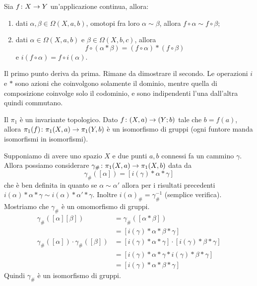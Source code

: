 \documentclass[a4paper]{article}
\begin{document}
\begin{snippetproposition}{}
    Sia \(f \colon X \to Y\) un'applicazione continua,
    allora:
    \begin{enumerate}
        \item dati \(\alpha, \beta \in \Omega(X, a, b)\), omotopi fra loro \(\alpha \sim \beta\),
        allora \(f \circ \alpha \sim f \circ \beta\);
        \item dati \(\alpha \in \Omega(X, a, b)\) e \(\beta \in \Omega(X, b, c)\), allora
        \[f \circ (\alpha \ast \beta) = (f \circ \alpha) \ast (f \circ \beta)\]
        e \(i(f \circ \alpha) = f \circ i(\alpha)\).
    \end{enumerate}
\end{snippetproposition}

\begin{snippetproof}{}
    Il primo punto deriva da prima. Rimane da dimostrare il secondo.
    Le operazioni \(i\) e \(\ast\) sono azioni che coinvolgono solamente il dominio,
    mentre quella di composizione coinvolge solo il codominio,
    e sono indipendenti l'una dall'altra quindi commutano.
\end{snippetproof}

\begin{snippetproposition}{}
    Il \(\pi_1\) è un invariante topologico.
    Dato \(f \colon (X, a) \to (Y; b)\) tale che \(b = f(a)\),
    allora \(\pi_1(f) \colon \pi_1(X, a) \to \pi_1(Y, b)\)
    è un isomorfismo di gruppi (ogni funtore manda isomorfismi in isomorfismi).
\end{snippetproposition}

Supponiamo di avere uno spazio \(X\) e due punti \(a,b\) connessi fa un cammino
\(\gamma\).
Allora possiamo considerare \(\gamma_{\#} \colon \pi_1(X, a) \to \pi_1(X, b)\)
data da
\[
    \gamma_{\#}([\alpha])
    = [i(\gamma) \ast \alpha \ast \gamma]
\]
che è ben definita in quanto se \(\alpha \sim \alpha'\)
allora per i risultati precedenti \(i(\alpha) \ast \alpha \ast \gamma \sim i(\alpha) \ast \alpha' \ast \gamma\).
Inoltre \(i(\alpha)_{\#} = \gamma_{\#}^{-1}\) (semplice verifica).
Mostriamo che \(\gamma_{\#}\) è un omomorfismo di gruppi.
\begin{align*}
    \gamma_{\#}([\alpha][\beta])
    &= \gamma_{\#}([\alpha \ast \beta]) \\
    &= [i(\gamma) \ast \alpha \ast \beta \ast \gamma] \\
    \gamma_{\#}([\alpha]) \cdot \gamma_{\#}([\beta]) &= [i(\gamma) \ast \alpha \ast \gamma] \cdot [i(\gamma) \ast \beta \ast \gamma] \\
    &= [i(\gamma) \ast \alpha \ast \gamma \ast i(\gamma) \ast \beta \ast \gamma] \\
    &= [i(\gamma) \ast \alpha \ast \beta \ast \gamma]
\end{align*}
Quindi \(\gamma_{\#}\) è un isomorfismo di gruppi.
\end{document}
